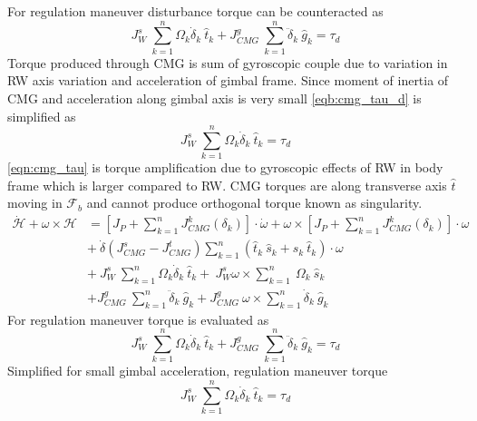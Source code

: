 For regulation maneuver disturbance torque can be counteracted as
\begin{equation}
J^{s}_{W} \ \sum ^{n}_{k=1} \Omega _{k}\dot{\delta}_{k} \ \hat{t}_{k} +J^{g}_{CMG} \ \sum ^{n}_{k=1}\ddot{\delta}_{k} \ \hat{g}_{k} =\tau _{d}
\label{eqb:cmg_tau_d}
\end{equation}
Torque produced through CMG is sum of gyroscopic couple due to variation in RW axis variation and acceleration of gimbal frame. Since moment of inertia of CMG and acceleration along gimbal axis is very small \autoref{eqb:cmg_tau_d} is simplified as
\begin{equation}
J^{s}_{W} \ \sum ^{n}_{k=1} \Omega _{k}\dot{\delta}_{k} \ \hat{t}_{k} =\tau _{d}
\label{eqn:cmg_tau}
\end{equation}
\autoref{eqn:cmg_tau} is torque amplification due to gyroscopic effects of RW in body frame which is larger compared to RW. CMG torques are along transverse axis $\displaystyle \hat{t}$ moving in $\displaystyle \mathcal{F}_{b}$ and cannot produce orthogonal torque known as singularity.
\begin{equation}
\begin{aligned}
\dot{\mathcal{H}} +\omega \times \mathcal{H} & =\left[ J_{P} +\sum ^{n}_{k=1} J^{k}_{CMG}( \delta_{k})\right] \cdotp \dot{\omega } +\omega \times \left[ J_{P} +\sum ^{n}_{k=1} J^{k}_{CMG}( \delta_{k})\right] \cdotp \omega \\
 & +\ \dot{\delta}\left( J^{s}_{CMG} -J^{t}_{CMG}\right)\sum ^{n}_{k=1}(\hat{t}_{k} \ \hat{s}_{k} +\hat{s}_{k} \ \hat{t}_{k}) \cdotp \omega \\
 & +\ J^{s}_{W} \ \sum ^{n}_{k=1} \Omega _{k}\dot{\delta}_{k} \ \hat{t}_{k} +\ J^{s}_{W} \omega \times \sum ^{n}_{k=1} \ \Omega _{k} \ \hat{s}_{k}\\
 & +J^{g}_{CMG} \ \sum ^{n}_{k=1}\ddot{\delta}_{k} \ \hat{g}_{k} +J^{g}_{CMG} \ \omega \times \sum ^{n}_{k=1}\dot{\delta}_{k} \ \hat{g}_{k}
\end{aligned}
\end{equation}
For regulation maneuver torque is evaluated as
\begin{equation}
J^{s}_{W} \ \sum ^{n}_{k=1} \Omega _{k}\dot{\delta}_{k} \ \hat{t}_{k} +J^{g}_{CMG} \ \sum ^{n}_{k=1}\ddot{\delta}_{k} \ \hat{g}_{k} =\tau _{d}
\end{equation}
Simplified for small gimbal acceleration, regulation maneuver torque
\begin{equation}
J^{s}_{W} \ \sum ^{n}_{k=1} \Omega _{k}\dot{\delta}_{k} \ \hat{t}_{k} =\tau _{d}
\end{equation}
